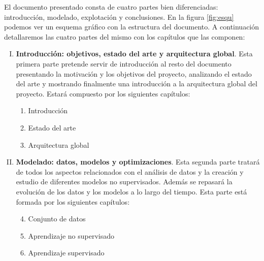 El documento presentado  consta de cuatro partes bien diferenciadas: introducción, modelado, explotación y conclusiones. En la figura \ref{fig:esqu} podemos ver un esquema gráfico con la estructura del documento.  A continuación detallaremos las cuatro partes del mismo con los capítulos que las componen: 

\begin{enumerate}[I.]
\item \textbf{Introducción: objetivos, estado del arte y arquitectura global}.  Esta primera parte pretende servir de introducción al resto del documento presentando la motivación y los objetivos del proyecto, analizando el estado del arte y mostrando finalmente una introducción a la arquitectura global del proyecto. Estará compuesto por los siguientes capítulos:

\begin{enumerate}[1.]
\item Introducción
\item Estado del arte
\item Arquitectura global
\end{enumerate}

\item \textbf{Modelado: datos, modelos y optimizaciones}. Esta segunda parte tratará de todos los aspectos relacionados con el análisis de datos y la creación y estudio de diferentes modelos no supervisados. Además se repasará la evolución de los datos y los modelos a lo largo del tiempo. Esta parte está formada por los siguientes capítulos:

\begin{enumerate}[1.]
\setcounter{enumii}{3}
\item Conjunto de datos
\item Aprendizaje no supervisado
\item Aprendizaje supervisado 
\end{enumerate}



\end{enumerate}
